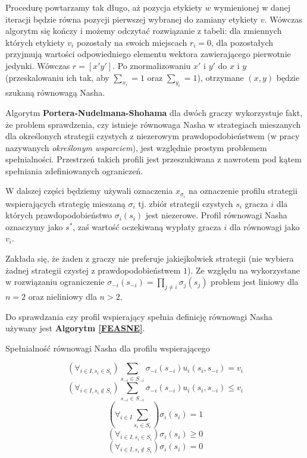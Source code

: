 \documentclass[polish]{standalone}
\begin{document}
Procedurę powtarzamy tak długo, aż pozycja etykiety $w$ wymienionej w danej iteracji będzie równa pozycji pierwszej
wybranej do zamiany etykiety $v$. Wówczas algorytm się kończy i możemy odczytać rozwiązanie z tabeli: dla zmiennych
których etykiety $v_i$ pozostały na swoich miejscach $r_i = 0$, dla pozostałych przyjmują wartości odpowiedniego
elementu wektora zawierającego pierwotnie jedynki. Wówczas $r = [ x' y' ]$. Po znormalizowaniu $x'$ i $y'$ do $x$ i $y$
(przeskalowaniu ich tak, aby $\sum_{x_i} = 1$ oraz $\sum_{y_i} = 1$), otrzymane $(x, y)$ będzie szukaną równowagą Nasha.

Algorytm \textbf{Portera-Nudelmana-Shohama}\cite{PNS-NE} dla dwóch graczy wykorzystuje fakt, że problem sprawdzenia,
czy istnieje równowaga Nasha w strategiach mieszanych dla określonych strategii czystych z niezerowym
prawdopodobieństwem (w pracy nazywanych \textit{określonym wsparciem}), jest względnie
prostym problemem spełnialności. Przestrzeń takich profili jest przeszukiwana z nawrotem pod kątem spełniania
zdefiniowanych ograniczeń.

W dalszej części będziemy używali oznaczenia $x_{\sigma_i}$ na oznaczenie profilu strategii wspierających strategię
mieszaną $\sigma_i$ tj. zbiór strategii czystych $s_i$ gracza $i$ dla których prawdopodobieństwo $\sigma_i(s_i)$ jest
niezerowe. Profil równowagi Nasha oznaczymy jako $s^{*}$, zaś wartość oczekiwaną wypłaty gracza $i$ dla równowagi jako
$v_i$.

Zakłada się, że żaden z graczy nie preferuje jakiejkolwiek strategii (nie wybiera żadnej strategii czystej z
prawdopodobieństwem $1$). Ze względu na wykorzystane w rozwiązaniu ograniczenie $\sigma_{-i}(s_{-i}) = \prod_{j \ne i}
\sigma_j(s_j)$ problem jest liniowy dla $n = 2$ oraz nieliniowy dla $n > 2$.

Do sprawdzania czy profil wspierający spełnia definicję równowagi Nasha używany jest \textbf{Algorytm \ref{FEASNE}}.
\begin{algorithm}
\caption{Spełnialność równowagi Nasha dla profilu wspierającego}
\label{FEASNE}
\begin{algorithmic}
$$(\forall_{i \in I, s_i \in S_i}) \sum_{s_{-i} \in S_{-i}} \sigma_{-i}(s_{-i}) u_i(s_i, s_{-i}) = v_i$$
$$(\forall_{i \in I, s_i \not\in S_i}) \sum_{s_{-i} \in S_{-i}} \sigma_{-i}(s_{-i}) u_i(s_i, s_{-i}) \leq v_i$$
$$(\forall_{i \in I} \sum_{s_i \in S_i}) \sigma_i(s_i) = 1$$
$$(\forall_{i \in I, s_i \in S_i}) \sigma_i(s_i) \geq 0$$
$$(\forall_{i \in I, s_i \not\in S_i}) \sigma_i(s_i) = 0$$
\end{algorithmic}
\end{algorithm}
\end{document}
